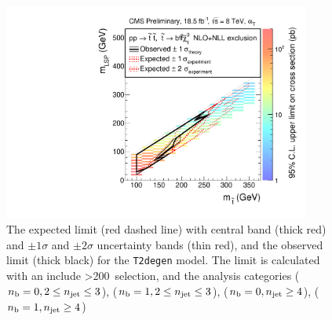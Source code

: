 \begin{figure}[h!]
\centering
\includegraphics[width=0.9\textwidth]{Figs/sms/t2degen/limit_v0/T2degen_toys_XSEC.pdf}
\caption{The expected limit (red dashed line) with central band (thick red)
and $\pm1\sigma$ and $\pm2\sigma$ uncertainty bands (thin red), and the
observed limit (thick black) for the \texttt{T2degen} model. The limit is
calculated with an include \HT>200~\gev selection, and the analysis categories 
($n_{\text{b}} = 0, 2\leq n_{\text{jet}}\leq3$), ($n_{\text{b}} = 1, 2\leq n_{\text{jet}}\leq3$), ($n_{\text{b}} = 0, n_{\text{jet}} \geq 4$), ($n_{\text{b}} = 1,
n_{\text{jet}} \geq 4$)}
\label{fig:t2degen_limit}
\end{figure}

